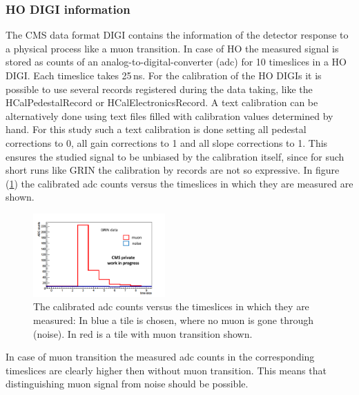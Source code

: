 		\subsubsection{HO DIGI information}
			The CMS data format DIGI contains the information of the detector response to a physical process like a muon transition.
			In case of HO the measured signal is stored as counts of an analog-to-digital-converter (adc) for 10 timeslices in a HO DIGI.
			Each timeslice takes 25\,ns.
			For the calibration of the HO DIGIs it is possible to use several records registered during the data taking, like the HCalPedestalRecord or HCalElectronicsRecord.
			A text calibration can be alternatively done using text files filled with calibration values determined by hand.
			For this study such a text calibration is done setting all pedestal corrections to 0, all gain corrections to 1 and all slope corrections to 1.
			This ensures the studied signal to be unbiased by the calibration itself, since for such short runs like GRIN the calibration by records are not so expressive.
			In figure (\ref{fig:adc_vs_ts}) the calibrated adc counts versus the timeslices in which they are measured are shown.
			\begin{figure}[htbp]
				\centering
				\includegraphics[width=0.45\textwidth]{Figures/erdogan/adc_vs_ts.png}
				\caption{The calibrated adc counts versus the timeslices in which they are measured: In blue a tile is chosen, where no muon is gone through (noise). In red is a tile with muon transition shown.}
				\label{fig:adc_vs_ts}
			\end{figure}
			In case of muon transition the measured adc counts in the corresponding timeslices are clearly higher then without muon transition.
			This means that distinguishing muon signal from noise should be possible.
